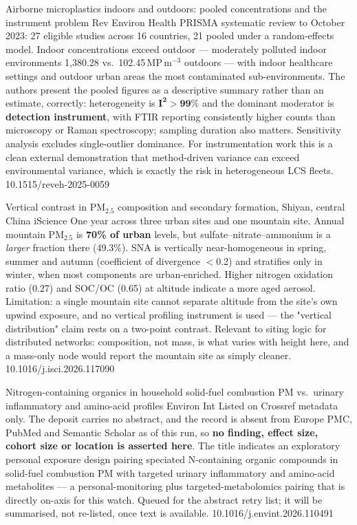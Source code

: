\documentclass[10pt]{article}
\begin{document}

{Airborne microplastics indoors and outdoors: pooled concentrations and the instrument problem}
{Rev Environ Health}
{PRISMA systematic review to October 2023: 27 eligible studies across 16 countries, 21
pooled under a random-effects model. Indoor concentrations exceed outdoor --- moderately
polluted indoor environments 1{,}380.28 vs.\ 102.45\,MP\,m$^{-3}$ outdoors --- with indoor
healthcare settings and outdoor urban areas the most contaminated sub-environments.
The authors present the pooled figures as a descriptive summary rather than an estimate,
correctly: heterogeneity is $\mathbf{I^2>99\%}$ and the dominant moderator is
\textbf{detection instrument}, with FTIR reporting consistently higher counts than
microscopy or Raman spectroscopy; sampling duration also matters. Sensitivity analysis
excludes single-outlier dominance. For instrumentation work this is a clean external
demonstration that method-driven variance can exceed environmental variance, which is
exactly the risk in heterogeneous LCS fleets.}
{10.1515/reveh-2025-0059}

{Vertical contrast in PM$_{2.5}$ composition and secondary formation, Shiyan, central China}
{iScience}
{One year across three urban sites and one mountain site. Annual mountain PM$_{2.5}$ is
\textbf{70\% of urban} levels, but sulfate--nitrate--ammonium is a \emph{larger} fraction
there (49.3\%). SNA is vertically near-homogeneous in spring, summer and autumn
(coefficient of divergence $<$0.2) and stratifies only in winter, when most components are
urban-enriched. Higher nitrogen oxidation ratio (0.27) and SOC/OC (0.65) at altitude
indicate a more aged aerosol. Limitation: a single mountain site cannot separate altitude
from the site's own upwind exposure, and no vertical profiling instrument is used --- the
"vertical distribution" claim rests on a two-point contrast. Relevant to siting logic for
distributed networks: composition, not mass, is what varies with height here, and a
mass-only node would report the mountain site as simply cleaner.}
{10.1016/j.isci.2026.117090}


{Nitrogen-containing organics in household solid-fuel combustion PM vs.\ urinary inflammatory
and amino-acid profiles}
{Environ Int}
{Listed on Crossref metadata only. The deposit carries no abstract, and the record is absent
from Europe PMC, PubMed and Semantic Scholar as of this run, so \textbf{no finding, effect
size, cohort size or location is asserted here}. The title indicates an exploratory personal
exposure design pairing speciated N-containing organic compounds in solid-fuel combustion PM
with targeted urinary inflammatory and amino-acid metabolites --- a personal-monitoring plus
targeted-metabolomics pairing that is directly on-axis for this watch. Queued for the
abstract retry list; it will be summarised, not re-listed, once text is available.}
{10.1016/j.envint.2026.110491}
\end{document}
